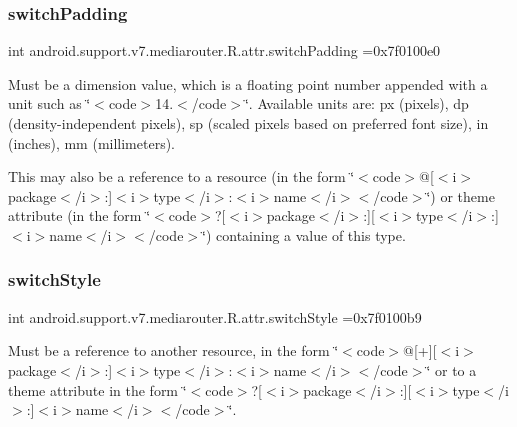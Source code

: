 \subsubsection{\texorpdfstring{switch\+Padding}{switchPadding}}
{\footnotesize\ttfamily int android.\+support.\+v7.\+mediarouter.\+R.\+attr.\+switch\+Padding =0x7f0100e0\hspace{0.3cm}{\ttfamily [static]}}

Must be a dimension value, which is a floating point number appended with a unit such as \char`\"{}$<$code$>$14.\+5sp$<$/code$>$\char`\"{}. Available units are\+: px (pixels), dp (density-\/independent pixels), sp (scaled pixels based on preferred font size), in (inches), mm (millimeters). 

This may also be a reference to a resource (in the form \char`\"{}$<$code$>$@\mbox{[}$<$i$>$package$<$/i$>$\+:\mbox{]}$<$i$>$type$<$/i$>$\+:$<$i$>$name$<$/i$>$$<$/code$>$\char`\"{}) or theme attribute (in the form \char`\"{}$<$code$>$?\mbox{[}$<$i$>$package$<$/i$>$\+:\mbox{]}\mbox{[}$<$i$>$type$<$/i$>$\+:\mbox{]}$<$i$>$name$<$/i$>$$<$/code$>$\char`\"{}) containing a value of this type. \mbox{\label{classandroid_1_1support_1_1v7_1_1mediarouter_1_1R_1_1attr_a8256dc7bd973274b19cb4aeb043d03a5}} 
\subsubsection{\texorpdfstring{switch\+Style}{switchStyle}}
{\footnotesize\ttfamily int android.\+support.\+v7.\+mediarouter.\+R.\+attr.\+switch\+Style =0x7f0100b9\hspace{0.3cm}{\ttfamily [static]}}

Must be a reference to another resource, in the form \char`\"{}$<$code$>$@\mbox{[}+\mbox{]}\mbox{[}$<$i$>$package$<$/i$>$\+:\mbox{]}$<$i$>$type$<$/i$>$\+:$<$i$>$name$<$/i$>$$<$/code$>$\char`\"{} or to a theme attribute in the form \char`\"{}$<$code$>$?\mbox{[}$<$i$>$package$<$/i$>$\+:\mbox{]}\mbox{[}$<$i$>$type$<$/i$>$\+:\mbox{]}$<$i$>$name$<$/i$>$$<$/code$>$\char`\"{}. \mbox{\label{classandroid_1_1support_1_1v7_1_1mediarouter_1_1R_1_1attr_ab2bb1fa141648601404a2b2b2462acf9}} 
